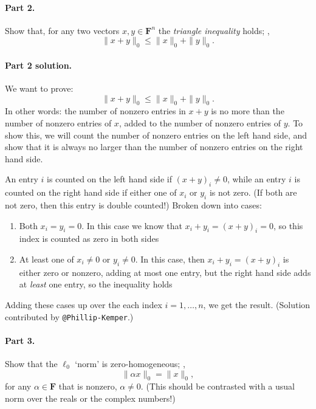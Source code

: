 \documentclass[12pt,hidelinks]{article}
\newcommand{\field}{\mathbf{F}}
\begin{document}
\paragraph{Part 2.} Show that, for any two vectors $x, y \in \field^n$
the \emph{triangle inequality} holds; \ie,
\[
    \|x + y\|_0 \le \|x\|_0 + \|y\|_0.
\]

\begin{solution}
\paragraph{Part 2 solution.} We want to prove:
\[
 \|x + y\|_0 \le \|x\|_0 + \|y\|_0.
\]
In other words: the number of nonzero entries in $x+y$ is no more than the
number of nonzero entries of $x$, added to the number of nonzero entries of
$y$. To show this, we will count the number of nonzero entries on the left hand
side, and show that it is always no larger than the number of nonzero entries
on the right hand side.

An entry $i$ is counted on the left hand side if $(x+y)_i\ne 0$, while an entry
$i$ is counted on the right hand side if either one of $x_i$ or $y_i$ is not
zero. (If both are not zero, then this entry is double counted!) Broken
down into cases:
\begin{enumerate}
    \item Both $x_i = y_i = 0$. In this case we know that $x_i + y_i = (x +
        y)_i = 0$, so this index is counted as zero in both sides
    \item At least one of $x_i \ne 0$ or $y_i \ne 0$. In this case, then $x_i
        + y_i = (x + y)_i$ is either zero or nonzero, adding at most one
        entry, but the right hand side adds at \emph{least} one entry, so the
        inequality holds
\end{enumerate}
Adding these cases up over the each index $i=1, \dots, n$, we get the result.
(Solution contributed by \verb|@Phillip-Kemper|.)

\end{solution}

\paragraph{Part 3.} Show that the $\ell_0$ `norm' is zero-homogeneous; \ie,
\[
    \|\alpha x\|_0 = \|x\|_0,
\]
for any $\alpha \in \field$ that is nonzero, $\alpha \ne 0$. (This should be
contrasted with a usual norm over the reals or the complex numbers!)
\end{document}
